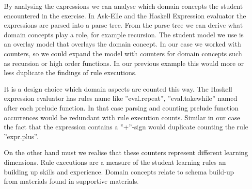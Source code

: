 By analysing the expressions we can analyse which domain concepts the student encountered in the exercise.
In Ask-Elle and the Haskell Expression evaluator the expressions are parsed into a parse tree.
From the parse tree we can derive what domain concepts play a role, for example recursion.
The student model we use is an overlay model that overlays the domain concept. 
In our case we worked with counters, so we could expand the model with counters for domain concepts such as recursion or high order functions.
In our previous example this would more or less duplicate the findings of rule executions.

It is a design choice which domain aspects are counted this way.
The Haskell expression evaluator has rules name like ''eval.repeat'', ''eval.takewhile'' named after each prelude function.
In that case parsing and counting prelude function occurrences would be redundant with rule execution counts.
Similar in our case the fact that the expression contains a ''+''-sign would duplicate counting the rule ''expr.plus''.

On the other hand must we realise that these counters represent different learning dimensions.
Rule executions are a measure of the student learning rules an building up skills and experience.
Domain concepts relate to schema build-up from materials found in supportive materials.























